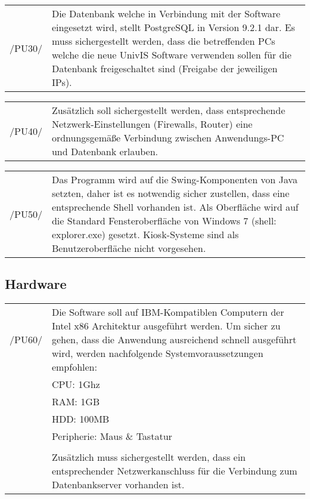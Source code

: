 \begin{tabular}{p{1.5cm}p{14.5cm}}

	 /PU30/	&  Die Datenbank welche in Verbindung mit der Software eingesetzt wird, stellt PostgreSQL in Version 9.2.1 dar.
Es muss sichergestellt werden, dass die betreffenden PCs welche die neue UnivIS Software verwenden sollen für die Datenbank freigeschaltet sind (Freigabe der jeweiligen IPs).\\[0.25cm]

\end{tabular}


\begin{tabular}{p{1.5cm}p{14.5cm}}

	 /PU40/	&  Zusätzlich soll sichergestellt werden, dass entsprechende Netzwerk-Einstellungen (Firewalls, Router) eine ordnungsgemäße Verbindung zwischen Anwendungs-PC und Datenbank erlauben.\\[0.25cm]

\end{tabular}


\begin{tabular}{p{1.5cm}p{14.5cm}}

	 /PU50/	&  Das Programm wird auf die Swing-Komponenten von Java setzten, daher ist es notwendig sicher zustellen, dass eine entsprechende Shell vorhanden ist.
Als Oberfläche wird auf die Standard Fensteroberfläche von Windows 7 (shell: explorer.exe) gesetzt. Kiosk-Systeme sind als Benutzeroberfläche nicht vorgesehen.\\[0.25cm]

\end{tabular}


\subsection{Hardware}
\label{subsec:hardware}


\begin{tabular}{p{1.5cm}p{14.5cm}}

	 /PU60/	&  Die Software soll auf IBM-Kompatiblen Computern der Intel x86 Architektur ausgeführt werden.
Um sicher zu gehen, dass die Anwendung ausreichend schnell ausgeführt wird, werden nachfolgende Systemvoraussetzungen empfohlen:\\

	&CPU: 1Ghz\\
	&RAM: 1GB\\
	&HDD: 100MB\\
	&Peripherie: Maus \& Tastatur\\
	&\\
	&Zusätzlich muss sichergestellt werden, dass ein entsprechender Netzwerkanschluss für die Verbindung zum Datenbankserver vorhanden ist.\\[0.25cm]


\end{tabular}

